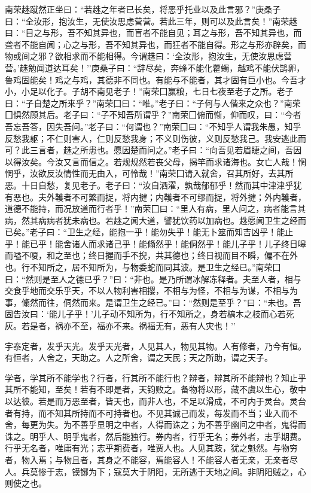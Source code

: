 \documentclass[]{article}
\begin{document}
南荣趎蹴然正坐曰：``若趎之年者已长矣，将恶乎托业以及此言邪？''庚桑子曰：``全汝形，抱汝生，无使汝思虑营营。若此三年，则可以及此言矣！''南荣趎曰：``目之与形，吾不知其异也，而盲者不能自见；耳之与形，吾不知其异也，而聋者不能自闻；心之与形，吾不知其异也，而狂者不能自得。形之与形亦辟矣，而物或间之邪？欲相求而不能相得。今谓趎曰：`全汝形，抱汝生，无使汝思虑营营。'趎勉闻道达耳矣！''庚桑子曰：``辞尽矣，奔蜂不能化藿蠋，越鸡不能伏鹄卵，鲁鸡固能矣！鸡之与鸡，其德非不同也。有能与不能者，其才固有巨小也。今吾才小，小足以化子。子胡不南见老子！''南荣囗赢粮，七日七夜至老子之所。老子曰：``子自楚之所来乎？''南荣囗曰：``唯。''老子曰：``子何与人偕来之众也？''南荣囗惧然顾其后。老子曰：``子不知吾所谓乎？''南荣囗俯而惭，仰而叹，曰：``今者吾忘吾答，因失吾问。''老子曰：``何谓也？''南荣囗曰：``不知乎人谓我朱愚，知乎反愁我躯；不仁则害人，仁则反愁我身；不义则伤彼，义则反愁我己。我安逃此而可？此三言者，趎之所患也。愿因楚而问之。''老子曰：``向吾见若眉睫之间，吾因以得汝矣。今汝又言而信之。若规规然若丧父母，揭竿而求诸海也。女亡人哉！惘惘乎，汝欲反汝情性而无由入，可怜哉！''南荣囗请入就舍，召其所好，去其所恶。十日自愁，复见老子。老子曰：``汝自洒濯，孰哉郁郁乎！然而其中津津乎犹有恶也。夫外韄者不可繁而捉，将内揵；内韄者不可缪而捉，将外揵；外内韄者，道德不能持，而况放道而行者乎！''南荣囗曰：``里人有病，里人问之，病者能言其病，然其病病者犹未病也。若趎之闻大道，譬犹饮药以加病也。趎愿闻卫生之经而已矣。''老子曰：``卫生之经，能抱一乎！能勿失乎！能无卜筮而知吉凶乎！能止乎！能已乎！能舍诸人而求诸己乎！能翛然乎！能侗然乎！能儿子乎！儿子终日嗥而嗌不嗄，和之至也；终日握而手不掜，共其德也；终日视而目不瞬，偏不在外也。行不知所之，居不知所为，与物委蛇而同其波。是卫生之经已。''南荣囗曰：``然则是至人之德已乎？''曰：``非也。是乃所谓冰解冻释者。夫至人者，相与交食乎地而交乐乎天，不以人物利害相撄，不相与为怪，不相与为谋，不相与为事，翛然而往，侗然而来。是谓卫生之经已。''曰：``然则是至乎？''曰：``未也。吾固告汝曰：`能儿子乎！'儿子动不知所为，行不知所之，身若槁木之枝而心若死灰。若是者，祸亦不至，福亦不来。祸福无有，恶有人灾也！''

宇泰定者，发乎天光。发乎天光者，人见其人，物见其物。人有修者，乃今有恒。有恒者，人舍之，天助之。人之所舍，谓之天民；天之所助，谓之天子。

学者，学其所不能学也？行者，行其所不能行也？辩者，辩其所不能辩也？知止乎其所不能知，至矣！若有不即是者，天钧败之。备物将以形，藏不虞以生心，敬中以达彼。若是而万恶至者，皆天也，而非人也，不足以滑成，不可内于灵台。灵台者有持，而不知其所持而不可持者也。不见其诚己而发，每发而不当；业入而不舍，每更为失。为不善乎显明之中者，人得而诛之；为不善乎幽间之中者，鬼得而诛之。明乎人、明乎鬼者，然后能独行。券内者，行乎无名；券外者，志乎期费。行乎无名者，唯庸有光；志乎期费者，唯贾人也。人见其跂，犹之魁然。与物穷者，物入焉；与物且者，其身之不能容，焉能容人！不能容人者无亲，无亲者尽人。兵莫惨于志，镆铘为下；寇莫大于阴阳，无所逃于天地之间。非阴阳贼之，心则使之也。
\end{document}
